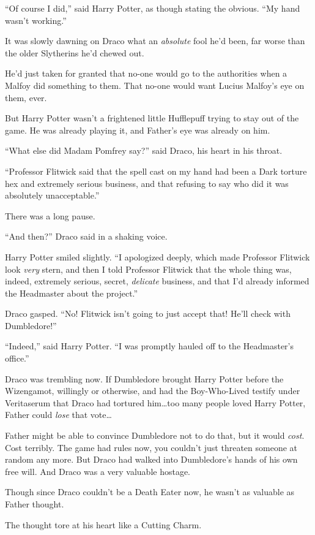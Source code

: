 “Of course I did,” said Harry Potter, as though stating the obvious. “My hand wasn’t working.”

It was slowly dawning on Draco what an \emph{absolute} fool he’d been, far worse than the older Slytherins he’d chewed out.

He’d just taken for granted that no-one would go to the authorities when a Malfoy did something to them. That no-one would want Lucius Malfoy’s eye on them, ever.

But Harry Potter wasn’t a frightened little Hufflepuff trying to stay out of the game. He was already playing it, and Father’s eye was already on him.

“What else did Madam Pomfrey say?” said Draco, his heart in his throat.

“Professor Flitwick said that the spell cast on my hand had been a Dark torture hex and extremely serious business, and that refusing to say who did it was absolutely unacceptable.”

There was a long pause.

“And then?” Draco said in a shaking voice.

Harry Potter smiled slightly. “I apologized deeply, which made Professor Flitwick look \emph{very} stern, and then I told Professor Flitwick that the whole thing was, indeed, extremely serious, secret, \emph{delicate} business, and that I’d already informed the Headmaster about the project.”

Draco gasped. “No! Flitwick isn’t going to just accept that! He’ll check with Dumbledore!”

“Indeed,” said Harry Potter. “I was promptly hauled off to the Headmaster’s office.”

Draco was trembling now. If Dumbledore brought Harry Potter before the Wizengamot, willingly or otherwise, and had the Boy-Who-Lived testify under Veritaserum that Draco had tortured him…too many people loved Harry Potter, Father could \emph{lose} that vote…

Father might be able to convince Dumbledore not to do that, but it would \emph{cost}. Cost terribly. The game had rules now, you couldn’t just threaten someone at random any more. But Draco had walked into Dumbledore’s hands of his own free will. And Draco was a very valuable hostage.

Though since Draco couldn’t be a Death Eater now, he wasn’t as valuable as Father thought.

The thought tore at his heart like a Cutting Charm.

